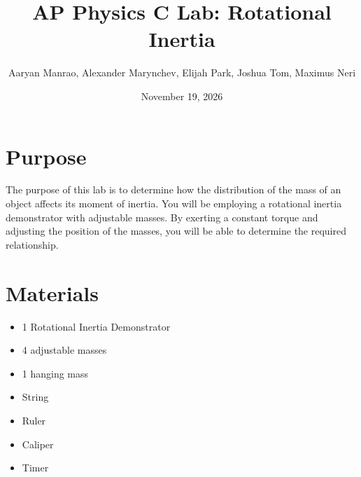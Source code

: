 \documentclass[11pt]{article}
\title{\textbf{AP Physics C Lab: Rotational Inertia}}
\author{Aaryan Manrao, Alexander Marynchev, Elijah Park, Joshua Tom, Maximus Neri}
\date{November 19, 2026}
\begin{document}
\maketitle

\section*{Purpose}
The purpose of this lab is to determine how the distribution of the mass of an object affects its moment of inertia. You will be employing a rotational inertia demonstrator with adjustable masses. By exerting a constant torque and adjusting the position of the masses, you will be able to determine the required relationship.

\section*{Materials}
\begin{itemize}[noitemsep]
    \item 1 Rotational Inertia Demonstrator
    \item 4 adjustable masses
    \item 1 hanging mass
    \item String
    \item Ruler
    \item Caliper
    \item Timer
\end{itemize}
\end{document}
